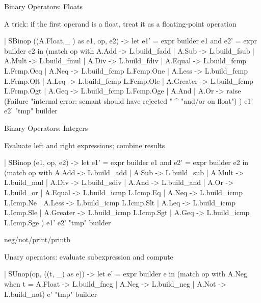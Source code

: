 \documentclass{plt}
\begin{document}
\begin{frame}[fragile=singleslide]{Binary Operators: Floats}

A trick: if the first operand is a float, treat it as a floating-point
operation

\begin{ocaml}
| SBinop ((A.Float,_ ) as e1, op, e2) ->
    let e1' = expr builder e1
    and e2' = expr builder e2 in
    (match op with 
      A.Add     -> L.build_fadd
    | A.Sub     -> L.build_fsub
    | A.Mult    -> L.build_fmul
    | A.Div     -> L.build_fdiv 
    | A.Equal   -> L.build_fcmp L.Fcmp.Oeq
    | A.Neq     -> L.build_fcmp L.Fcmp.One
    | A.Less    -> L.build_fcmp L.Fcmp.Olt
    | A.Leq     -> L.build_fcmp L.Fcmp.Ole
    | A.Greater -> L.build_fcmp L.Fcmp.Ogt
    | A.Geq     -> L.build_fcmp L.Fcmp.Oge
    | A.And | A.Or ->
    raise (Failure "internal error: semant should have rejected "
           ^ "and/or on float")
    ) e1' e2' "tmp" builder
\end{ocaml}
\end{frame}

\begin{frame}[fragile=singleslide]{Binary Operators: Integers}

Evaluate left and right expressions; combine results

\begin{ocaml}
| SBinop (e1, op, e2) ->
    let e1' = expr builder e1
    and e2' = expr builder e2 in
    (match op with
      A.Add     -> L.build_add
    | A.Sub     -> L.build_sub
    | A.Mult    -> L.build_mul
    | A.Div     -> L.build_sdiv
    | A.And     -> L.build_and
    | A.Or      -> L.build_or
    | A.Equal   -> L.build_icmp L.Icmp.Eq
    | A.Neq     -> L.build_icmp L.Icmp.Ne
    | A.Less    -> L.build_icmp L.Icmp.Slt
    | A.Leq     -> L.build_icmp L.Icmp.Sle
    | A.Greater -> L.build_icmp L.Icmp.Sgt
    | A.Geq     -> L.build_icmp L.Icmp.Sge
    ) e1' e2' "tmp" builder
\end{ocaml}
\end{frame}

\begin{frame}[fragile=singleslide]{neg/not/print/printb}

Unary operators: evaluate subexpression and compute

\begin{ocaml}
| SUnop(op, ((t, _) as e)) ->
    let e' = expr builder e in
    (match op with
      A.Neg when t = A.Float -> L.build_fneg 
    | A.Neg                  -> L.build_neg
    | A.Not                  -> L.build_not) e' "tmp" builder
\end{ocaml}

\end{frame}
\end{document}
